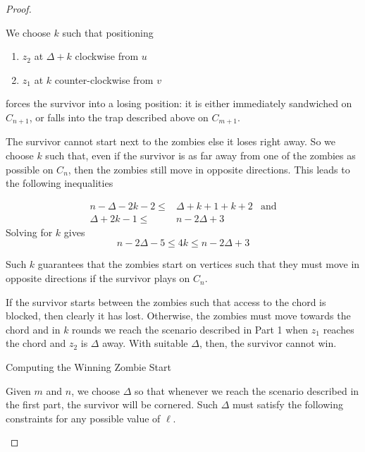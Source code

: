 \begin{proof}
\begin{proofpart}
  We choose $k$ such that positioning
  \begin{enumerate}
   \item $z_2$ at $\Delta + k$ clockwise from $u$
   \item $z_1$ at $k$ counter-clockwise from $v$
  \end{enumerate}
  forces the survivor into a losing position: it is either immediately sandwiched on $C_{n+1}$,
  or falls into the trap described above on $C_{m+1}$.

  The survivor cannot start next to the zombies else it loses right away.
  So we choose $k$ such that, even if the survivor is as far
  away from one of the zombies as possible on $C_n$, then the zombies
  still move in opposite directions. This leads to the following inequalities

  \begin{align*}
   n - \Delta - 2k - 2 \leq & \Delta + k +1 + k +2 & \text{and} \\
   \Delta + 2k -1 \leq      & n - 2\Delta +3
  \end{align*}
  Solving for $k$ gives
  \[ n - 2\Delta -5 \leq 4k \leq n-2\Delta +3 \]

  Such $k$ guarantees that the zombies start on vertices such that they must
  move in opposite directions if the survivor plays on $C_n$.

  If the survivor starts between the zombies such that
  access to the chord is blocked, then clearly it has lost. Otherwise,
   the zombies must move towards the chord and in $k$ rounds we reach the
    scenario described in Part 1 when $z_1$ reaches the chord and $z_2$ is
    $\Delta$ away. With suitable $\Delta$, then, the survivor cannot win.
 \end{proofpart}

 \begin{proofpart} Computing the Winning Zombie Start

  Given $m$ and $n$, we choose $\Delta$ so that whenever we reach
  the scenario described in the first part, the survivor will be cornered.
  Such $\Delta$ must satisfy the following constraints for any possible
  value of $\ell$.


\end{proofpart}
\end{proof}
